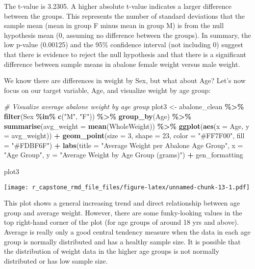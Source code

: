 \documentclass[
]{article}
\newenvironment{Shaded}{\begin{snugshade}}{\end{snugshade}}
\newcommand{\AttributeTok}[1]{\textcolor[rgb]{0.13,0.29,0.53}{#1}}
\newcommand{\CommentTok}[1]{\textcolor[rgb]{0.56,0.35,0.01}{\textit{#1}}}
\newcommand{\DecValTok}[1]{\textcolor[rgb]{0.00,0.00,0.81}{#1}}
\newcommand{\FunctionTok}[1]{\textcolor[rgb]{0.13,0.29,0.53}{\textbf{#1}}}
\newcommand{\NormalTok}[1]{#1}
\newcommand{\OtherTok}[1]{\textcolor[rgb]{0.56,0.35,0.01}{#1}}
\newcommand{\SpecialCharTok}[1]{\textcolor[rgb]{0.81,0.36,0.00}{\textbf{#1}}}
\newcommand{\StringTok}[1]{\textcolor[rgb]{0.31,0.60,0.02}{#1}}
\begin{document}
The t-value is 3.2305. A higher absolute t-value indicates a larger
difference between the groups. This represents the number of standard
deviations that the sample mean (mean in group F minus mean in group M)
is from the null hypothesis mean (0, assuming no difference between the
groups). In summary, the low p-value (0.00125) and the 95\% confidence
interval (not including 0) suggest that there is evidence to reject the
null hypothesis and that there is a significant difference between
sample means in abalone female weight versus male weight.

We know there are differences in weight by Sex, but what about Age?
Let's now focus on our target variable, Age, and visualize weight by age
group:

\begin{Shaded}
\begin{Highlighting}[]
\CommentTok{\# Visualize average abalone weight by age group}
\NormalTok{plot3 }\OtherTok{\textless{}{-}}\NormalTok{ abalone\_clean }\SpecialCharTok{\%\textgreater{}\%} \FunctionTok{filter}\NormalTok{(Sex }\SpecialCharTok{\%in\%} \FunctionTok{c}\NormalTok{(}\StringTok{"M"}\NormalTok{, }\StringTok{"F"}\NormalTok{)) }\SpecialCharTok{\%\textgreater{}\%} \FunctionTok{group\_by}\NormalTok{(Age) }\SpecialCharTok{\%\textgreater{}\%} 
  \FunctionTok{summarise}\NormalTok{(}\AttributeTok{avg\_weight =} \FunctionTok{mean}\NormalTok{(WholeWeight)) }\SpecialCharTok{\%\textgreater{}\%} 
  \FunctionTok{ggplot}\NormalTok{(}\FunctionTok{aes}\NormalTok{(}\AttributeTok{x =}\NormalTok{ Age, }\AttributeTok{y =}\NormalTok{ avg\_weight)) }\SpecialCharTok{+} 
  \FunctionTok{geom\_point}\NormalTok{(}\AttributeTok{size =} \DecValTok{3}\NormalTok{, }\AttributeTok{shape =} \DecValTok{23}\NormalTok{, }\AttributeTok{color =} \StringTok{"\#FF7F00"}\NormalTok{, }\AttributeTok{fill =} \StringTok{"\#FDBF6F"}\NormalTok{) }\SpecialCharTok{+}
  \FunctionTok{labs}\NormalTok{(}\AttributeTok{title =} \StringTok{"Average Weight per Abalone Age Group"}\NormalTok{,}
       \AttributeTok{x =} \StringTok{"Age Group"}\NormalTok{,}
       \AttributeTok{y =} \StringTok{"Average Weight by Age Group (grams)"}\NormalTok{) }\SpecialCharTok{+}
\NormalTok{  gen\_formatting}

\NormalTok{plot3}
\end{Highlighting}
\end{Shaded}

\texttt{[image: r\_capstone\_rmd\_file\_files/figure-latex/unnamed-chunk-13-1.pdf]}

This plot shows a general increasing trend and direct relationship
between age group and average weight. However, there are some
funky-looking values in the top right-hand corner of the plot (for age
groups of around 18 yrs and above). Average is really only a good
central tendency measure when the data in each age group is normally
distributed and has a healthy sample size. It is possible that the
distribution of weight data in the higher age groups is not normally
distributed or has low sample size.
\end{document}
